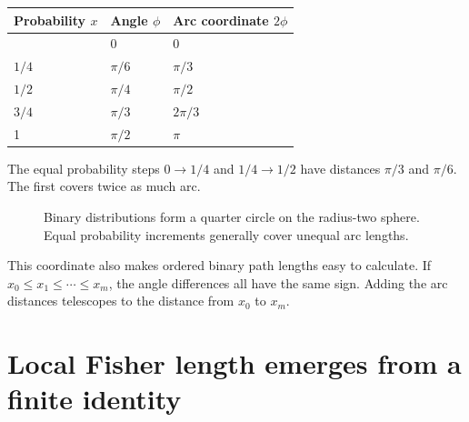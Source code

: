 \documentclass[11pt,oneside,openany]{book}
\theoremstyle{definition}
\theoremstyle{remark}
\numberwithin{equation}{chapter}
\begin{document}
\begin{longtable}[]{@{}lll@{}}
\toprule\noalign{}
Probability \(x\) & Angle \(\phi\) & Arc coordinate \(2\phi\) \\
\midrule\noalign{}
\endhead
\bottomrule\noalign{}
\endlastfoot
0 & 0 & 0 \\
\(1/4\) & \(\pi/6\) & \(\pi/3\) \\
\(1/2\) & \(\pi/4\) & \(\pi/2\) \\
\(3/4\) & \(\pi/3\) & \(2\pi/3\) \\
1 & \(\pi/2\) & \(\pi\) \\
\end{longtable}

The equal probability steps \(0\to1/4\) and \(1/4\to1/2\) have distances \(\pi/3\) and \(\pi/6\). The first covers twice as much arc.

\begin{figure}[htbp]\centering
{}
\caption{Binary distributions form a quarter circle on the radius-two sphere. Equal probability increments generally cover unequal arc lengths.}\end{figure}

This coordinate also makes ordered binary path lengths easy to calculate. If \(x_0\leq x_1\leq\cdots\leq x_m\), the angle differences all have the same sign. Adding the arc distances telescopes to the distance from \(x_0\) to \(x_m\).

\section{Local Fisher length emerges from a finite identity}\label{ch07-local-fisher-length-emerges-from-a-finite-identity}
\end{document}
